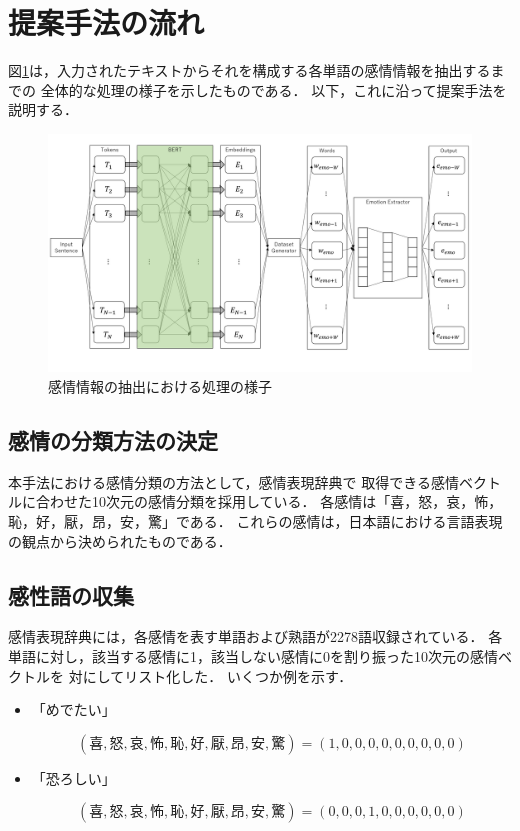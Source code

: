 	\section{提案手法の流れ}
		図\ref{fig:whole_image}は，入力されたテキストからそれを構成する各単語の感情情報を抽出するまでの
		全体的な処理の様子を示したものである．
		以下，これに沿って提案手法を説明する．

		\begin{figure}[H]
			\centering
			\includegraphics[width=\linewidth]{./figure/whole_image.png}
			\caption{感情情報の抽出における処理の様子}
			\label{fig:whole_image}
		\end{figure}

		\subsection{感情の分類方法の決定}
			本手法における感情分類の方法として，感情表現辞典\cite{kanjou_hyogen_jiten}で
			取得できる感情ベクトルに合わせた10次元の感情分類を採用している．
			各感情は「喜，怒，哀，怖，恥，好，厭，昂，安，驚」である．
			これらの感情は，日本語における言語表現の観点から決められたものである．

		\subsection{感性語の収集}
			感情表現辞典には，各感情を表す単語および熟語が2278語収録されている．
			各単語に対し，該当する感情に1，該当しない感情に0を割り振った10次元の感情ベクトルを
			対にしてリスト化した．
			いくつか例を示す．
			\begin{itemize}
				\item 「めでたい」
				\par $$(喜, 怒, 哀, 怖, 恥, 好, 厭, 昂, 安, 驚)=(1, 0, 0, 0, 0, 0, 0, 0, 0, 0)$$
				\item 「恐ろしい」
				\par $$(喜, 怒, 哀, 怖, 恥, 好, 厭, 昂, 安, 驚)=(0, 0, 0, 1, 0, 0, 0, 0, 0, 0)$$
			\end{itemize}

